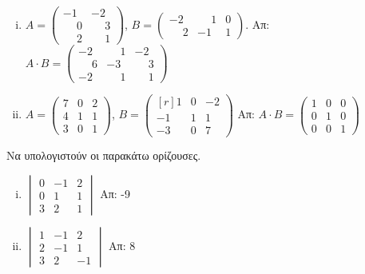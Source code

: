 \begin{enumerate}
\begin{enumerate}[i)]
\item $A=\begin{pmatrix}
-1 & -2 \\
\phantom{-}0 & \phantom{-}3 \\
\phantom{-}2 & \phantom{-}1 
\end{pmatrix}$,
\quad 
$B=\begin{pmatrix}
-2 & \phantom{-}1 & 0 \\
\phantom{-}2 & -1 & 1 
\end{pmatrix}$. \hfill Απ: $A\cdot B=\begin{pmatrix}
-2 & \phantom{-}1 & -2 \\
\phantom{-}6 & -3 & \phantom{-}3 \\
-2 & \phantom{-}1 & \phantom{-}1 
\end{pmatrix}$

\item $A = \begin{pmatrix}
        7 & 0 & 2 \\
        4 & 1 & 1 \\
        3 & 0 & 1 
    \end{pmatrix}$, 
    \quad
    $ B = \begin{pmatrix*}[r]
        1 & 0 & -2 \\
        -1 & 1 & 1 \\
        -3 & 0 & 7
        \end{pmatrix*} $ \hfill Απ: $ A \cdot B = \begin{pmatrix}
        1 & 0 & 0 \\
        0 & 1 & 0 \\
        0 & 0 & 1
    \end{pmatrix} $ 

\end{enumerate}

Να υπολογιστούν οι παρακάτω ορίζουσες.

\begin{enumerate}[i),itemsep=10pt]
    \item $\begin{vmatrix}
            0 & -1 & 2 \\
            0 & 1 & 1 \\
            3 & 2 & 1
        \end{vmatrix}$ 
        \hfill Απ: -9

    \item $\begin{vmatrix}
            1 & -1 & 2 \\
            2 & -1 & 1 \\
            3 & 2 & -1 
        \end{vmatrix}$
        \hfill Απ: 8 


\end{enumerate}
\end{enumerate}
